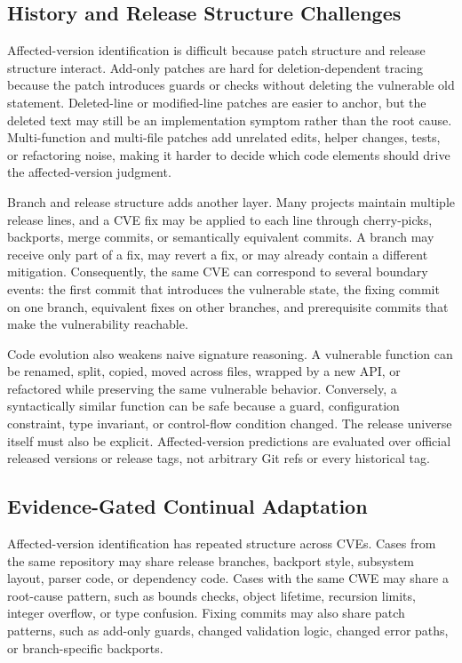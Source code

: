 \subsection{History and Release Structure Challenges}

Affected-version identification is difficult because patch structure and release structure interact. Add-only patches are hard for deletion-dependent tracing because the patch introduces guards or checks without deleting the vulnerable old statement. Deleted-line or modified-line patches are easier to anchor, but the deleted text may still be an implementation symptom rather than the root cause. Multi-function and multi-file patches add unrelated edits, helper changes, tests, or refactoring noise, making it harder to decide which code elements should drive the affected-version judgment.

Branch and release structure adds another layer. Many projects maintain multiple release lines, and a CVE fix may be applied to each line through cherry-picks, backports, merge commits, or semantically equivalent commits. A branch may receive only part of a fix, may revert a fix, or may already contain a different mitigation. Consequently, the same CVE can correspond to several boundary events: the first commit that introduces the vulnerable state, the fixing commit on one branch, equivalent fixes on other branches, and prerequisite commits that make the vulnerability reachable.

Code evolution also weakens naive signature reasoning. A vulnerable function can be renamed, split, copied, moved across files, wrapped by a new API, or refactored while preserving the same vulnerable behavior. Conversely, a syntactically similar function can be safe because a guard, configuration constraint, type invariant, or control-flow condition changed. The release universe itself must also be explicit. Affected-version predictions are evaluated over official released versions or release tags, not arbitrary Git refs or every historical tag.

\subsection{Evidence-Gated Continual Adaptation}

Affected-version identification has repeated structure across CVEs. Cases from the same repository may share release branches, backport style, subsystem layout, parser code, or dependency code. Cases with the same CWE may share a root-cause pattern, such as bounds checks, object lifetime, recursion limits, integer overflow, or type confusion. Fixing commits may also share patch patterns, such as add-only guards, changed validation logic, changed error paths, or branch-specific backports.

